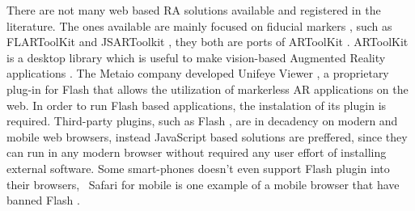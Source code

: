 There are not many web based RA solutions available and registered in the literature. The ones available are mainly focused on fiducial markers \cite{Cho1998}, such as FLARToolKit \cite{Yan2011} and JSARToolkit \cite{JSARToolkit2011}, they both are ports of ARToolKit \cite{Hirokazu2002}. ARToolKit is a desktop library which is useful to make vision-based Augmented Reality applications \cite{Hirokazu2002}. The Metaio company developed Unifeye Viewer \cite{Metaio2009}, a proprietary plug-in for Flash \cite{Flash2013} that allows the utilization of markerless AR applications on the web. In order to run Flash \cite{Flash2013} based applications, the instalation of its plugin is required. Third-party plugins, such as Flash \cite{Flash2013}, are in decadency on modern and mobile web browsers, instead JavaScript \cite{International2009} based solutions are preffered, since they can run in any modern browser without required any user effort of installing external software. Some smart-phones doesn't even support Flash \cite{Flash2013} plugin into their browsers, \eg\ Safari for mobile \cite{Safari2013} is one example of a mobile browser that have banned Flash \cite{Flash2013}.

